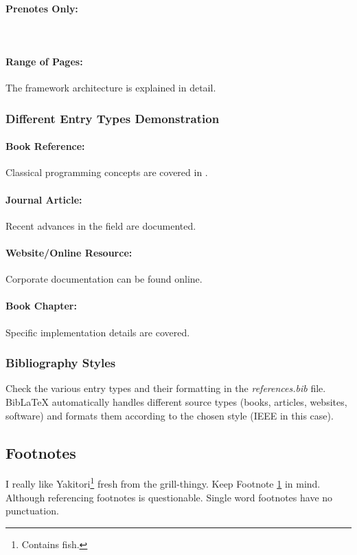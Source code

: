 \paragraph{Prenotes Only:}
\cite[cf.][]{DUMMY:1}
\\

\paragraph{Range of Pages:}
The framework architecture is explained in detail\cite[S.~10--25]{gin-framework}.
\\

\subsubsection{Different Entry Types Demonstration}

\paragraph{Book Reference:}
Classical programming concepts are covered in \textcite{DUMMY:1}.

\paragraph{Journal Article:}
Recent advances in the field are documented\cite{ARTICLE:1}.

\paragraph{Website/Online Resource:}
Corporate documentation can be found online\cite{WEBSITE:1}.

\paragraph{Book Chapter:}
Specific implementation details are covered\cite[Chapter~5]{BOOK:2}.

\subsubsection{Bibliography Styles}
Check the various entry types and their formatting in the \textit{references.bib} file. BibLaTeX automatically handles different source types (books, articles, websites, software) and formats them according to the chosen style (IEEE in this case).

\subsection{Footnotes}
I really like Yakitori\footnote{\label{fn:fishwarning}Contains fish.} fresh from the grill-thingy.
Keep Footnote \ref{fn:fishwarning} in mind.
Although referencing footnotes is questionable.
Single word footnotes have no punctuation.

